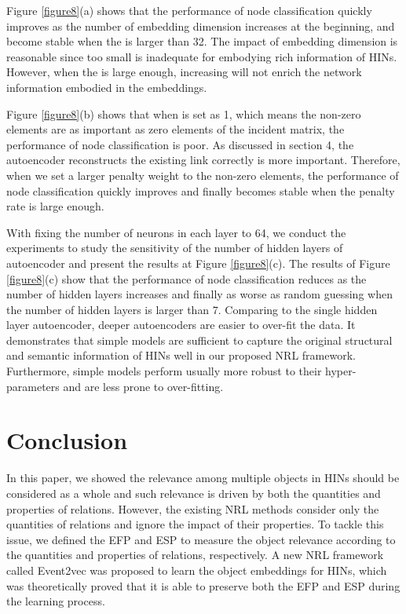Figure \ref{figure8}(a) shows that the performance of node classification quickly improves as the number of embedding dimension  increases at the beginning, and become stable when the  is larger than 32. The impact of embedding dimension is reasonable since too small  is inadequate for embodying rich information of HINs. However, when the  is large enough, increasing  will not enrich the network information embodied in the embeddings.

Figure \ref{figure8}(b) shows that when  is set as 1, which means the non-zero elements are as important as zero elements of the incident matrix, the performance of node classification is poor. As discussed in section 4, the autoencoder reconstructs the existing link correctly is more important. Therefore, when we set a larger penalty weight to the non-zero elements, the performance of node classification quickly improves and finally becomes stable when the penalty rate is large enough.

With fixing the number of neurons in each layer to 64, we conduct the experiments to study the sensitivity of the number of hidden layers of autoencoder and present the results at Figure \ref{figure8}(c). The results of Figure \ref{figure8}(c) show that the performance of node classification reduces as the number of hidden layers increases and finally as worse as random guessing when the number of hidden layers is larger than 7. Comparing to the single hidden layer autoencoder, deeper autoencoders are easier to over-fit the data. It demonstrates that simple models are sufficient to capture the original structural and semantic information of HINs well in our proposed NRL framework. Furthermore, simple models perform usually more robust to their hyper-parameters and are less prone to over-fitting.

\section{Conclusion}
In this paper, we showed the relevance among multiple objects in HINs should be considered as a whole and such relevance is driven by both the quantities and properties of relations. However, the existing NRL methods consider only the quantities of relations and ignore the impact of their properties. To tackle this issue, we defined the EFP and ESP to measure the object relevance according to the quantities and properties of relations, respectively. A new NRL framework called Event2vec was proposed to learn the object embeddings for HINs, which was theoretically proved that it is able to preserve both the EFP and ESP during the learning process.

